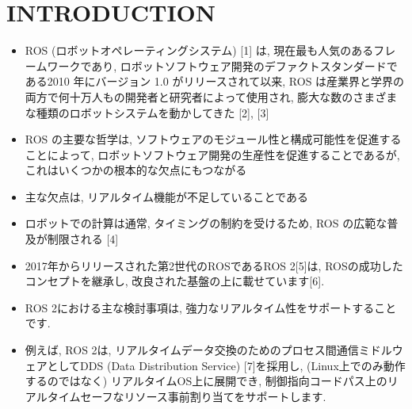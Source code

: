 
\section{INTRODUCTION}
\label{sec: introduction}

\begin{frame}{}
    \begin{itemize}
        \item ROS (ロボットオペレーティングシステム) [1] は, 現在最も人気のあるフレームワークであり, ロボットソフトウェア開発のデファクトスタンダードである2010 年にバージョン 1.0 がリリースされて以来, ROS は産業界と学界の両方で何十万人もの開発者と研究者によって使用され, 膨大な数のさまざまな種類のロボットシステムを動かしてきた [2], [3]
        \item ROS の主要な哲学は, ソフトウェアのモジュール性と構成可能性を促進することによって, ロボットソフトウェア開発の生産性を促進することであるが, これはいくつかの根本的な欠点にもつながる
        \item 主な欠点は, リアルタイム機能が不足していることである
        \item ロボットでの計算は通常, タイミングの制約を受けるため, ROS の広範な普及が制限される [4]
    \end{itemize}
\end{frame}

\begin{frame}{}
    \begin{itemize}
        \item 2017年からリリースされた第2世代のROSであるROS 2[5]は, ROSの成功したコンセプトを継承し, 改良された基盤の上に載せています[6].
        \item ROS 2における主な検討事項は, 強力なリアルタイム性をサポートすることです.
        \item 例えば, ROS 2は, リアルタイムデータ交換のためのプロセス間通信ミドルウェアとしてDDS (Data Distribution Service) [7]を採用し,  (Linux上でのみ動作するのではなく) リアルタイムOS上に展開でき, 制御指向コードパス上のリアルタイムセーフなリソース事前割り当てをサポートします.
    \end{itemize}
\end{frame}

